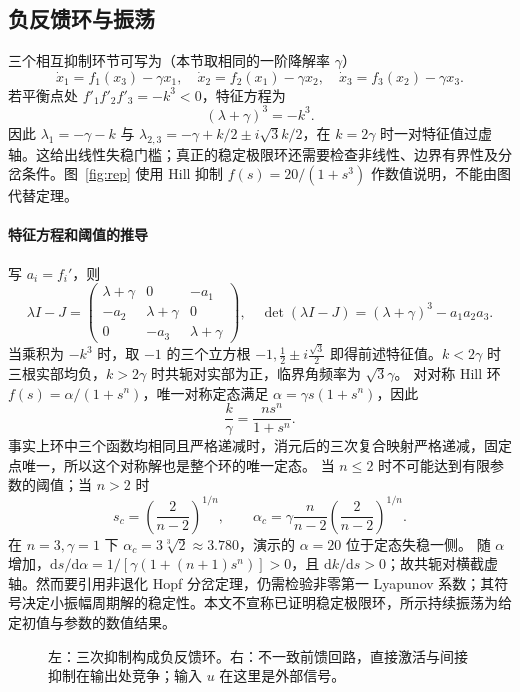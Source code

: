 \documentclass[11pt,a4paper,UTF8,fontset=fandol]{ctexart}
\newcommand{\dd}{\mathrm d}\newcommand{\R}{\mathbb R}\newcommand{\ssv}{\mathrm{ss}}
\begin{document}
\subsection{负反馈环与振荡}
三个相互抑制环节可写为（本节取相同的一阶降解率 $\gamma$）
\begin{equation}\dot x_1=f_1(x_3)-\gamma x_1,\quad\dot x_2=f_2(x_1)-\gamma x_2,\quad\dot x_3=f_3(x_2)-\gamma x_3.\end{equation}
若平衡点处 $f'_1f'_2f'_3=-k^3<0$，特征方程为
\begin{equation}(\lambda+\gamma)^3=-k^3.\end{equation}
因此 $\lambda_1=-\gamma-k$ 与 $\lambda_{2,3}=-\gamma+k/2\pm i\sqrt3k/2$，在 $k=2\gamma$ 时一对特征值过虚轴。这给出线性失稳门槛；真正的稳定极限环还需要检查非线性、边界有界性及分岔条件。图~\ref{fig:rep} 使用 Hill 抑制 $f(s)=20/(1+s^3)$ 作数值说明，不能由图代替定理。


\paragraph{特征方程和阈值的推导}
写 $a_i=f_i'$，则
\[
\lambda I-J=\begin{pmatrix}\lambda+\gamma&0&-a_1\\-a_2&\lambda+\gamma&0\\0&-a_3&\lambda+\gamma\end{pmatrix},
\quad \det(\lambda I-J)=(\lambda+\gamma)^3-a_1a_2a_3.
\]
当乘积为 $-k^3$ 时，取 $-1$ 的三个立方根 $-1,\frac12\pm i\frac{\sqrt3}{2}$ 即得前述特征值。$k<2\gamma$ 时三根实部均负，$k>2\gamma$ 时共轭对实部为正，临界角频率为 $\sqrt3\gamma$。
对对称 Hill 环 $f(s)=\alpha/(1+s^n)$，唯一对称定态满足 $\alpha=\gamma s(1+s^n)$，因此
\[
\frac k\gamma=\frac{ns^n}{1+s^n}.
\]
事实上环中三个函数均相同且严格递减时，消元后的三次复合映射严格递减，固定点唯一，所以这个对称解也是整个环的唯一定态。
当 $n\leq2$ 时不可能达到有限参数的阈值；当 $n>2$ 时
\[
s_c=\left(\frac2{n-2}\right)^{1/n},\qquad
\alpha_c=\gamma\frac n{n-2}\left(\frac2{n-2}\right)^{1/n}.
\]
在 $n=3,\gamma=1$ 下 $\alpha_c=3\sqrt[3]2\approx3.780$，演示的 $\alpha=20$ 位于定态失稳一侧。
随 $\alpha$ 增加，$\dd s/\dd\alpha=1/[\gamma(1+(n+1)s^n)]>0$，且 $\dd k/\dd s>0$；故共轭对横截虚轴。然而要引用非退化 Hopf 分岔定理，仍需检验非零第一 Lyapunov 系数；其符号决定小振幅周期解的稳定性。本文不宣称已证明稳定极限环，所示持续振荡为给定初值与参数的数值结果。
\begin{figure}[htbp]\centering
{}
\caption{左：三次抑制构成负反馈环。右：不一致前馈回路，直接激活与间接抑制在输出处竞争；输入 $u$ 在这里是外部信号。}
\end{figure}
\end{document}
